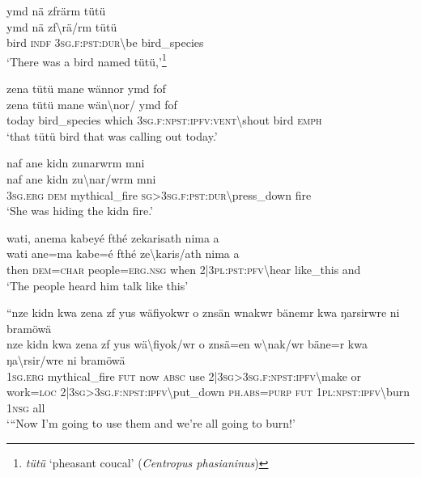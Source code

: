 \ea\label{ex:11:a2538}
ymd nä zfrärm tütü\\
\gll ymd	nä	zf{\textbackslash}rä/rm	tütü\\
     bird	\textsc{indf}	3\textsc{sg}.\textsc{f}:\textsc{pst}:\textsc{dur}{\textbackslash}be	bird\_species\\
\glt `There was a bird named tütü,'\footnote{\textit{tütü} `pheasant coucal' (\textit{Centropus phasianinus})}
\z

\ea\label{ex:11:a2539}
zena tütü mane wännor ymd fof\\
\gll zena	tütü	mane	wän{\textbackslash}nor/	ymd	fof\\
     today	bird\_species	which	3\textsc{sg}.\textsc{f}:\textsc{npst}:\textsc{ipfv}:\textsc{vent}{\textbackslash}shout	bird	\textsc{emph}\\
\glt `that tütü bird that was calling out today.'
\z

\ea\label{ex:11:a2540}
naf ane kidn zunarwrm mni\\
\gll naf	ane	kidn	zu{\textbackslash}nar/wrm	mni\\
     3\textsc{sg}.\textsc{erg}	\textsc{dem}	mythical\_fire	\textsc{sg}>3\textsc{sg}.\textsc{f}:\textsc{pst}:\textsc{dur}{\textbackslash}press\_down	fire\\
\glt `She was hiding the kidn fire.'
\z

\ea\label{ex:11:a2541}
wati, anema kabeyé fthé zekarisath nima a\\
\gll wati	ane=ma	kabe=é	fthé	ze{\textbackslash}karis/ath	nima	a\\
     then	\textsc{dem}=\textsc{char}	people=\textsc{erg}.\textsc{nsg}	when	2|3\textsc{pl}:\textsc{pst}:\textsc{pfv}{\textbackslash}hear	like\_this	and\\
\glt `The people heard him talk like this'
\z

\ea\label{ex:11:a2542}
``nze kidn kwa zena zf yus wäfiyokwr o znsän wnakwr bänemr kwa ŋarsirwre ni bramöwä\\
\gll nze	kidn	kwa	zena	zf	yus	wä{\textbackslash}fiyok/wr	o	znsä=en	w{\textbackslash}nak/wr	bäne=r	kwa	ŋa{\textbackslash}rsir/wre	ni	bramöwä\\
     1\textsc{sg}.\textsc{erg}	mythical\_fire	\textsc{fut}	now	\textsc{absc}	use	2|3\textsc{sg}>3\textsc{sg}.\textsc{f}:\textsc{npst}:\textsc{ipfv}{\textbackslash}make	or	work=\textsc{loc}	2|3\textsc{sg}>3\textsc{sg}.\textsc{f}:\textsc{npst}:\textsc{ipfv}{\textbackslash}put\_down	\textsc{ph}.\textsc{abs}=\textsc{purp}	\textsc{fut}	1\textsc{pl}:\textsc{npst}:\textsc{ipfv}{\textbackslash}burn	1\textsc{nsg}	all\\
\glt `{``}Now I'm going to use them and we're all going to burn!'
\z

